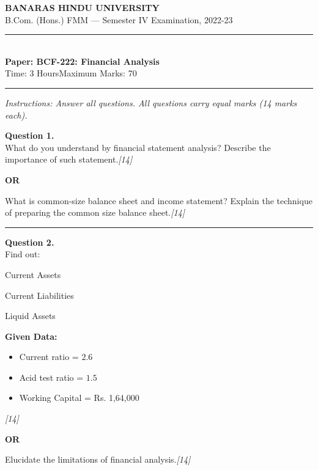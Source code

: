 \documentclass[11pt,a4paper]{article}
\newcommand{\pts}[1]{\hfill   \textit{[#1]}}
\begin{document}
\begin{center}
  {\large\bfseries BANARAS HINDU UNIVERSITY}\\[2pt]
  {\normalsize B.Com. (Hons.) FMM --- Semester IV Examination, 2022-23}\\[6pt]
  \rule{0.8\linewidth}{0.5pt}\\[6pt]
  {\large\bfseries Paper: BCF-222: Financial Analysis}\\[4pt]
  {\normalsize Time: 3 Hours\hfill Maximum Marks: 70}
\end{center}

\rule{\linewidth}{0.4pt}

\smallskip



\noindent   \textit{Instructions: Answer all questions. All questions carry equal marks (14 marks each).}

\bigskip




\noindent   \textbf{Question 1.} \\
What do you understand by financial statement analysis? Describe the importance of such statement.\pts{14}

\centerline{   \textbf{OR}}

What is common-size balance sheet and income statement? Explain the technique of preparing the common size balance sheet.\pts{14}

\medskip\rule{\linewidth}{0.2pt}




\noindent   \textbf{Question 2.} \\
Find out:

\begin{parts}
  \item Current Assets
  \item Current Liabilities
  \item Liquid Assets
\end{parts}
   \textbf{Given Data:}

\begin{itemize}[leftmargin=*]
  \item Current ratio = $2.6$
  \item Acid test ratio = $1.5$
  \item Working Capital = Rs. 1,64,000
\end{itemize}\pts{14}

\centerline{   \textbf{OR}}

Elucidate the limitations of financial analysis.\pts{14}
\end{document}
